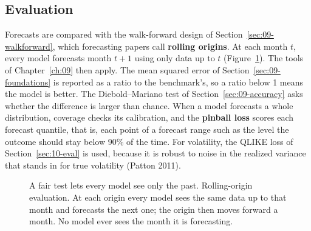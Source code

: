 \subsection{Evaluation}

Forecasts are compared with the walk-forward design of Section~\ref{sec:09-walkforward}, which forecasting papers call \textbf{rolling origins}. At each month $t$, every model forecasts month $t+1$ using only data up to $t$ (Figure~\ref{fig:21-rolling}). The tools of Chapter~\ref{ch:09} then apply. The mean squared error of Section~\ref{sec:09-foundations} is reported as a ratio to the benchmark's, so a ratio below 1 means the model is better. The Diebold--Mariano test of Section~\ref{sec:09-accuracy} asks whether the difference is larger than chance. When a model forecasts a whole distribution, coverage checks its calibration, and the \textbf{pinball loss} scores each forecast quantile, that is, each point of a forecast range such as the level the outcome should stay below 90\% of the time. For volatility, the QLIKE loss of Section~\ref{sec:10-eval} is used, because it is robust to noise in the realized variance that stands in for true volatility (Patton 2011).

\begin{figure}[htbp]
\centering
{}
\caption{A fair test lets every model see only the past. Rolling-origin evaluation. At each origin every model sees the same data up to that month and forecasts the next one; the origin then moves forward a month. No model ever sees the month it is forecasting.}
\label{fig:21-rolling}
\end{figure}


